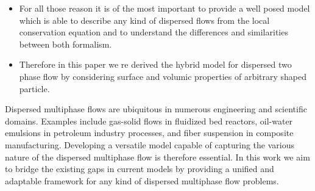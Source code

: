 {\begin{itemize}
\begin{itemize}
        \item Proof of the equivalence between the dispersed and continuous formalism of the dispersed phase in the most general case and for volumic and surface quantities : 
        \begin{itemize}
            \item 
            It has been treated by \citet{lhuillier2000bilan} in the restricted case of the air density conservation equation considering spherical particle.
            \item \citet{nott2011suspension} investigated this topic also, but their conclusion is not appropriate since they do not deal with the higher moments equations. thus their conclusion is somewhat incomplete. 
            \item And a part has been treated in \citet{zhang1997momentum}
        \end{itemize}
    \end{itemize}
    \item  For all those reason it is of the most important to provide a well posed model which is able to describe any kind of dispersed flows from the local conservation equation and to understand the differences and similarities between both formalism. 
    \item Therefore in this paper we re derived the hybrid model for dispersed two phase flow by considering surface and volumic properties of arbitrary shaped particle.
\end{itemize}
}

Dispersed multiphase flows are ubiquitous in numerous engineering and scientific domains. 
Examples include gas-solid flows in fluidized bed reactors, oil-water emulsions in petroleum industry processes, and fiber suspension in composite manufacturing. 
Developing a versatile model capable of capturing the various nature of the dispersed multiphase flow is therefore essential.
In this work we aim to bridge the existing gaps in current models by providing a unified and adaptable framework for any kind of dispersed multiphase flow problems.

